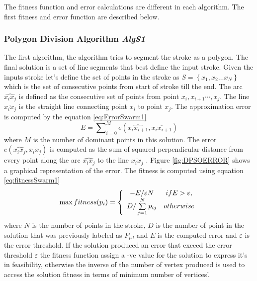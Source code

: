 The fitness function and error calculations are different in each algorithm. The first fitness and error function are described below. 


\subsubsection{Polygon Division Algorithm \textsl{AlgS1}}
\label{sec:PolygonDivisionAlgorithm}
The first algorithm, the algorithm tries to segment the stroke as a polygon. The final solution is a set of line segments that best define the input stroke. Given the inputs stroke let's define the set of points in the stroke as  $S = \left\{ {x_1 ,x_2  \ldots x_N } \right\}$ which is the set of consecutive points from start of stroke till the end. The arc $\widehat{x_ix_j}$ is defined as the consecutive set of points from point $x_i,x_{i+1} \cdots,x_j$. The line
$\overline{x_i x_j} $ is the straight line connecting point $x_i$ to point $x_j$. The approximation error is computed by the equation \ref{eq:ErrorSwarm1} 
\begin{equation}
E=\sum\nolimits_{i = 0}^M e ( \widehat{x_ix_{i+1}},\overline{x_i x_{i+1}})
\label{eq:ErrorSwarm1}
\end{equation}
 where $M$ is the number of dominant points in this solution.  The error $ e ( \widehat{x_ix_j},\overline{x_i x_j})$ is computed as the sum of squared perpendicular distance from every point along the arc $\widehat{x_ix_j}$ to the line $\overline{x_i x_j}$ \cite{PolygonApproximationPSO}. Figure \ref{fig:DPSOERROR} shows a graphical representation of the error. The fitness is computed using equation \ref{eq:fitnessSwarm1} 
\begin{equation}
\max fitness(p_i ) = \left\{ {\begin{array}{*{20}c}
   { - E/\varepsilon N} & {ifE > \varepsilon ,}  \\
   {D/\sum\limits_{j = 1}^N {p_{ij} } } & {otherwise}  \\
\end{array}} \right.
\label{eq:fitnessSwarm1}
\end{equation}%
where $N$ is the number of points in the stroke, $D$ is the number of point in the solution that was previously labeled as $P_{pd}$  and $E$ is the computed error and $\varepsilon$ is the error threshold.  If the solution produced an error that exceed the error threshold $\varepsilon$ the fitness function assign a -ve value for the solution to express it's in feasibility, otherwise the inverse of the number of vertex produced is used to access the solution fitness in terms of minimum number of vertices'.   

